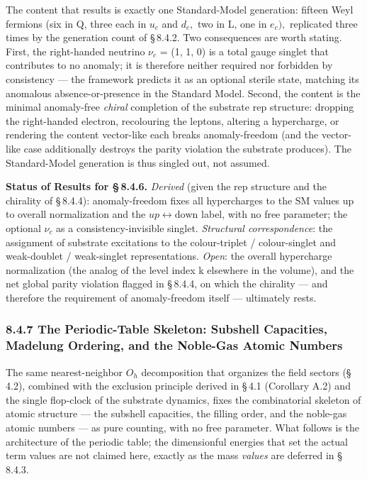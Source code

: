 \documentclass[11pt,oneside]{report}
\theoremstyle{definition}
\theoremstyle{remark}
\begin{document}
The content that results is exactly one Standard-Model generation:
fifteen Weyl fermions (six in Q, three each in \ensuremath{u_{c}} and \ensuremath{d_{c},} two in L, one
in \ensuremath{e_{c}),} replicated three times by the generation count of \S\,8.4.2. Two
consequences are worth stating. First, the right-handed neutrino \ensuremath{\nu_{c}} =
(1, 1, 0) is a total gauge singlet that contributes to no anomaly; it is
therefore neither required nor forbidden by consistency --- the
framework predicts it as an optional sterile state, matching its
anomalous absence-or-presence in the Standard Model. Second, the content
is the minimal anomaly-free \emph{chiral} completion of the substrate
rep structure: dropping the right-handed electron, recolouring the
leptons, altering a hypercharge, or rendering the content vector-like
each breaks anomaly-freedom (and the vector-like case additionally
destroys the parity violation the substrate produces). The
Standard-Model generation is thus singled out, not assumed.

\textbf{Status of Results for \S\,8.4.6.} \emph{Derived} (given the rep
structure and the chirality of \S\,8.4.4): anomaly-freedom fixes all
hypercharges to the SM values up to overall normalization and the
\ensuremath{up\leftrightarrow \text{down}} label, with no free parameter; the optional \ensuremath{\nu_{c}} as a
consistency-invisible singlet. \emph{Structural correspondence}: the
assignment of substrate excitations to the colour-triplet /
colour-singlet and weak-doublet / weak-singlet representations.
\emph{Open}: the overall hypercharge normalization (the analog of the
level index k elsewhere in the volume), and the net global parity
violation flagged in \S\,8.4.4, on which the chirality --- and therefore
the requirement of anomaly-freedom itself --- ultimately rests.

\subsubsection*{8.4.7 The Periodic-Table Skeleton: Subshell Capacities,
Madelung Ordering, and the Noble-Gas Atomic Numbers}

The same nearest-neighbor \ensuremath{O_{h}} decomposition that organizes the field
sectors (\S\,4.2), combined with the exclusion principle derived in \S\,4.1
(Corollary A.2) and the single flop-clock of the substrate dynamics,
fixes the combinatorial skeleton of atomic structure --- the subshell
capacities, the filling order, and the noble-gas atomic numbers --- as
pure counting, with no free parameter. What follows is the architecture of
the periodic table; the dimensionful energies that set the actual
term values are not claimed here, exactly as the mass \emph{values} are
deferred in \S\,8.4.3.
\end{document}
